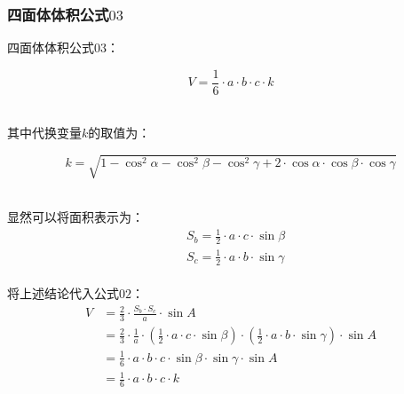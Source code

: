 \documentclass[UTF8]{ctexart}
\begin{document}
\newpage

\subsubsection{四面体体积公式$03$}
    四面体体积公式$03$：
    \begin{large}
        \begin{equation*}
            V=\frac{1}{6}\cdot a\cdot b\cdot c\cdot k
        \end{equation*}
    \end{large}\\
    其中代换变量$k$的取值为：\vspace{5pt}
    \begin{large}
        \begin{equation*}
            k=\sqrt{1-\cos^2{\alpha}-\cos^2{\beta}-\cos^2{\gamma}+2\cdot\cos{\alpha}\cdot\cos{\beta}\cdot\cos{\gamma}}
        \end{equation*}
    \end{large}\\[3mm]
    显然可以将面积表示为：
    \setcounter{equation}{0}
    \begin{align}
        &S_b=\frac{1}{2}\cdot a\cdot c\cdot\sin{\beta}\\[3mm]
        &S_c=\frac{1}{2}\cdot a\cdot b\cdot\sin{\gamma}
    \end{align}\\
    将上述结论代入公式$02$：\vspace{3pt}
    \begin{align}
        V
        &=\frac{2}{3}\cdot\frac{S_b\cdot S_c}{a}\cdot\sin{A}\\[3mm]
        &=\frac{2}{3}\cdot\frac{1}{a}\cdot\left(\frac{1}{2}\cdot a\cdot c\cdot\sin{\beta}\right)\cdot\left(\frac{1}{2}\cdot a\cdot b\cdot\sin{\gamma}\right)\cdot\sin{A}\\[3mm]
        &=\frac{1}{6}\cdot a\cdot b\cdot c\cdot\sin{\beta}\cdot\sin{\gamma}\cdot\sin{A}\\[3mm]
        &=\frac{1}{6}\cdot a\cdot b\cdot c\cdot k
    \end{align}
\end{document}
